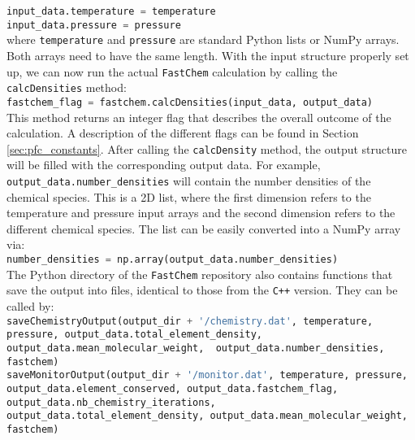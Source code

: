 \documentclass[numbers=noenddot]{fcmanual}
\newcommand{\fc}{\texttt{FastChem}\xspace}
\newcommand{\cpp}{\ttt{C++}\xspace}
\newcommand{\ttt}[1]{\texttt {#1}}
\begin{document}
\lstinline[language=Python]!input_data.temperature = temperature!\\
\lstinline[language=Python]!input_data.pressure = pressure!\\

where \lstinline[language=Python]!temperature! and \lstinline[language=Python]!pressure! are standard Python lists or NumPy arrays. Both arrays need to have the same length.
With the input structure properly set up, we can now run the actual \fc calculation by calling the \lstinline[language=Python]!calcDensities! method:\\

\lstinline[language=Python]!fastchem_flag = fastchem.calcDensities(input_data, output_data)!\\

This method returns an integer flag that describes the overall outcome of the calculation. A description of the different flags can be found in Section \ref{sec:pfc_constants}. After calling the \lstinline[language=Python]!calcDensity! method, the output structure will be filled with the corresponding output data. For example, \\
\lstinline[language=Python]!output_data.number_densities!
will contain the number densities of the chemical species. This is a 2D list, where the first dimension refers to the temperature and pressure input arrays and the second dimension refers to the different chemical species. The list can be easily converted into a NumPy array via:\\

\lstinline[language=Python]!number_densities = np.array(output_data.number_densities)!\\

The Python directory of the \fc repository also contains functions that save the output into files, identical to those from the \cpp version. They can be called by:\\

\lstinline[language=Python, breaklines, breakatwhitespace]!saveChemistryOutput(output_dir + '/chemistry.dat', temperature, pressure, output_data.total_element_density, output_data.mean_molecular_weight,  output_data.number_densities, fastchem)!\\

\lstinline[language=Python, breaklines, breakatwhitespace]!saveMonitorOutput(output_dir + '/monitor.dat', temperature, pressure, output_data.element_conserved, output_data.fastchem_flag, output_data.nb_chemistry_iterations, output_data.total_element_density, output_data.mean_molecular_weight, fastchem)!\\
\end{document}
